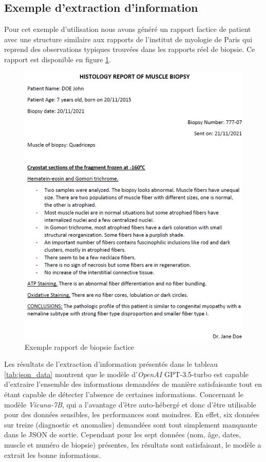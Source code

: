 \subsection{Exemple d'extraction d'information}
Pour cet exemple d'utilisation nous avons généré un rapport factice de patient avec une structure similaire aux rapports de l'institut de myologie de Paris qui reprend des observations typiques trouvées dans les rapports réel de biopsie. Ce rapport est disponible en figure \ref{fig:factice_report}. 
\begin{figure}[htbp]
 \centering
 \includegraphics[width=1\textwidth]{figures/pdf_biopsie.png}
 \caption[Rapport de biopsie factice]{Exemple rapport de biopsie factice}
 \label{fig:factice_report}
\end{figure}

Les résultats de l'extraction d'information présentés dans le tableau \ref{tab:json_data} montrent que le modèle d'\textit{OpenAI} GPT-3.5-turbo est capable d'extraire l'ensemble des informations demandées de manière satisfaisante tout en étant capable de détecter l'absence de certaines informations. Concernant le modèle \textit{Vicuna-7B}, qui a l'avantage d'être auto-hébergé et donc d'être utilisable pour des données sensibles, les performances sont moindres. En effet, six données sur treize (diagnostic et anomalies) demandées sont tout simplement manquante dans le JSON de sortie. Cependant pour les sept données (nom, âge, dates, muscle et numéro de biopsie) présentes, les résultats sont satisfaisant, le modèle a extrait les bonne informations.

